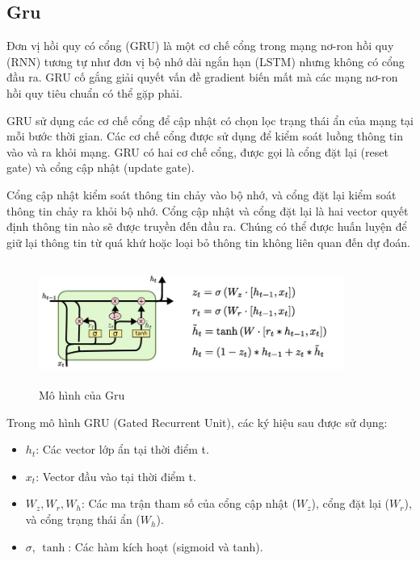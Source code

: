 \documentclass[conference]{IEEEtran}
\begin{document}
\subsection{\textbf{Gru}}
Đơn vị hồi quy có cổng (GRU) là một cơ chế cổng trong mạng nơ-ron hồi quy (RNN) tương tự như đơn vị bộ nhớ dài ngắn hạn (LSTM) nhưng không có cổng đầu ra. GRU cố gắng giải quyết vấn đề gradient biến mất mà các mạng nơ-ron hồi quy tiêu chuẩn có thể gặp phải.

GRU sử dụng các cơ chế cổng để cập nhật có chọn lọc trạng thái ẩn của mạng tại mỗi bước thời gian. Các cơ chế cổng được sử dụng để kiểm soát luồng thông tin vào và ra khỏi mạng. GRU có hai cơ chế cổng, được gọi là cổng đặt lại (reset gate) và cổng cập nhật (update gate).

Cổng cập nhật kiểm soát thông tin chảy vào bộ nhớ, và cổng đặt lại kiểm soát thông tin chảy ra khỏi bộ nhớ. Cổng cập nhật và cổng đặt lại là hai vector quyết định thông tin nào sẽ được truyền đến đầu ra. Chúng có thể được huấn luyện để giữ lại thông tin từ quá khứ hoặc loại bỏ thông tin không liên quan đến dự đoán.
 \begin{figure}[H]
     \centering
     \includegraphics[width= 10cm, height= 4cm]{Images/Gru.png}
     \caption{Mô hình của Gru}
     \label{fig:enter-label}
 \end{figure}
 Trong mô hình GRU (Gated Recurrent Unit), các ký hiệu sau được sử dụng:

\begin{itemize}
    \item $h_t$: Các vector lớp ẩn tại thời điểm t.
    \item $x_t$: Vector đầu vào tại thời điểm t.
    \item $W_z, W_r, W_h$: Các ma trận tham số của cổng cập nhật ($W_z$), cổng đặt lại ($W_r$), và cổng trạng thái ẩn ($W_h$).
    \item $\sigma$, $\tanh$: Các hàm kích hoạt (sigmoid và tanh).
\end{itemize}
\end{document}
